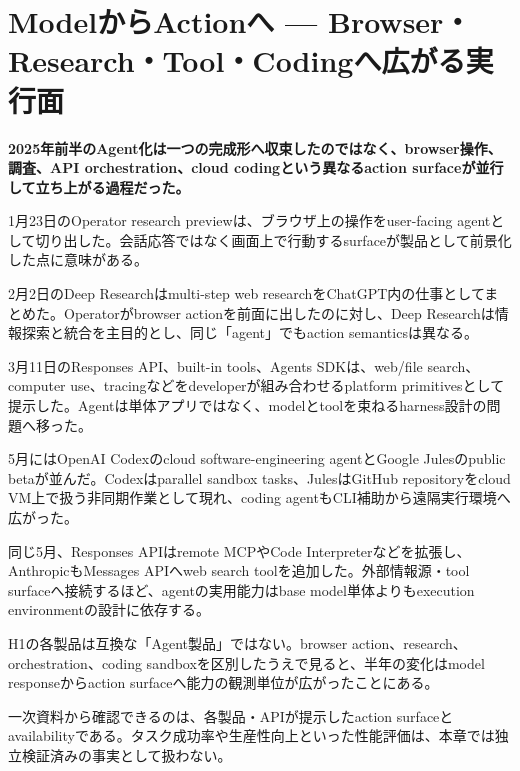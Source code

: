 \section{ModelからActionへ — Browser・Research・Tool・Codingへ広がる実行面}
\noindent\textbf{2025年前半のAgent化は一つの完成形へ収束したのではなく、browser操作、調査、API orchestration、cloud codingという異なるaction surfaceが並行して立ち上がる過程だった。}\autocite{src-78593f4b387f,src-8fec3ef3a97d,src-95b210494c88}

1月23日のOperator research previewは、ブラウザ上の操作をuser-facing agentとして切り出した。会話応答ではなく画面上で行動するsurfaceが製品として前景化した点に意味がある。\autocite{src-95b210494c88}


2月2日のDeep Researchはmulti-step web researchをChatGPT内の仕事としてまとめた。Operatorがbrowser actionを前面に出したのに対し、Deep Researchは情報探索と統合を主目的とし、同じ「agent」でもaction semanticsは異なる。\autocite{src-8fec3ef3a97d}


3月11日のResponses API、built-in tools、Agents SDKは、web/file search、computer use、tracingなどをdeveloperが組み合わせるplatform primitivesとして提示した。Agentは単体アプリではなく、modelとtoolを束ねるharness設計の問題へ移った。\autocite{src-78593f4b387f}


5月にはOpenAI Codexのcloud software-engineering agentとGoogle Julesのpublic betaが並んだ。Codexはparallel sandbox tasks、JulesはGitHub repositoryをcloud VM上で扱う非同期作業として現れ、coding agentもCLI補助から遠隔実行環境へ広がった。\autocite{src-8b595b787bad,src-e7aef8f1b13b}


同じ5月、Responses APIはremote MCPやCode Interpreterなどを拡張し、AnthropicもMessages APIへweb search toolを追加した。外部情報源・tool surfaceへ接続するほど、agentの実用能力はbase model単体よりもexecution environmentの設計に依存する。\autocite{src-9257c39d4172,src-e31c642d34b6}


H1の各製品は互換な「Agent製品」ではない。browser action、research、orchestration、coding sandboxを区別したうえで見ると、半年の変化はmodel responseからaction surfaceへ能力の観測単位が広がったことにある。\autocite{src-78593f4b387f,src-8fec3ef3a97d,src-95b210494c88,src-e7aef8f1b13b}


\begin{claimboundary}
一次資料から確認できるのは、各製品・APIが提示したaction surfaceとavailabilityである。タスク成功率や生産性向上といった性能評価は、本章では独立検証済みの事実として扱わない。
\end{claimboundary}
